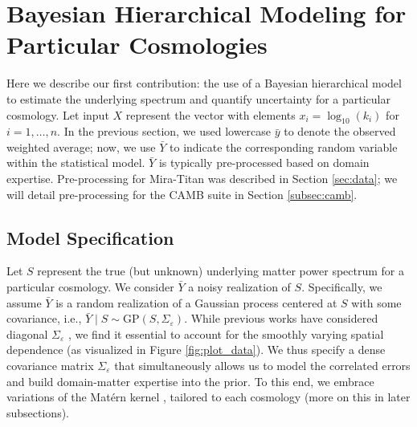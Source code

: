 \documentclass[11pt]{article}
\begin{document}

\section{Bayesian Hierarchical Modeling for Particular Cosmologies}
\label{sec:hm_fit}

Here we describe our first contribution: the use of a Bayesian hierarchical model 
to estimate the underlying spectrum and quantify uncertainty for a particular cosmology.
Let input $X$ represent the vector with elements $x_i = \log_{10}(k_i)$ for $i=1,\dots,n$.
In the previous section, we used lowercase $\bar{y}$ to denote 
the observed weighted average; now, we use $\bar{Y}$ to indicate the corresponding 
random variable within the statistical model.  
$\bar{Y}$ is typically pre-processed
based on domain expertise.  Pre-processing for Mira-Titan was described in Section 
\ref{sec:data}; we will detail pre-processing 
for the CAMB suite in Section \ref{subsec:camb}.

\subsection{Model Specification}
\label{sec:mod_spec}

Let $S$ represent the true (but unknown) underlying matter power spectrum for
a particular cosmology.  We consider $\bar{Y}$ a noisy realization of $S$.
Specifically, we assume $\bar{Y}$ is a random realization of a Gaussian 
process centered at $S$ with some covariance, i.e., 
$\bar{Y}\mid S \sim \mathrm{GP}(S, \Sigma_\varepsilon)$.  While previous works
have considered diagonal $\Sigma_\varepsilon$ \citep{moran2023mira}, we find it
essential to account for the smoothly varying spatial dependence
(as visualized in Figure \ref{fig:plot_data}).  We thus specify a dense 
covariance matrix $\Sigma_\varepsilon$ that simultaneously
allows us to model the correlated errors and build domain-matter expertise
into the prior. To this end, we embrace variations of the Mat\'ern kernel 
\citep{stein1999interpolation}, tailored to each cosmology (more on this in later 
subsections). 
\end{document}
